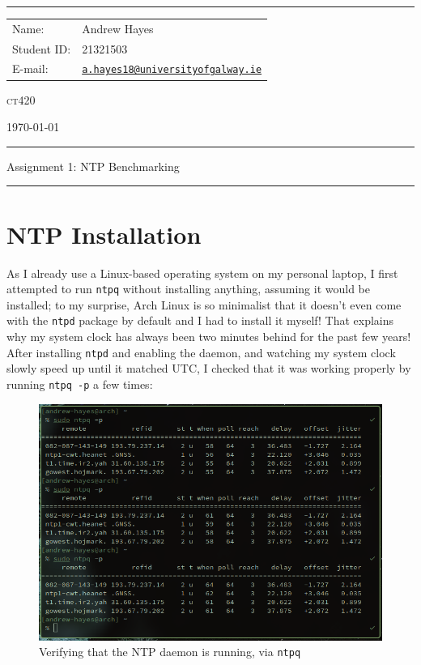 \documentclass[a4paper]{article}
\begin{document}
\hrule \medskip
\begin{minipage}{0.295\textwidth} 
    \raggedright
    \footnotesize 
    \begin{tabular}{@{}l l}
        Name: & Andrew Hayes \\
        Student ID: & 21321503 \\
        E-mail: & \href{mailto://a.hayes18@universityofgalway.ie}{\texttt{a.hayes18@universityofgalway.ie}} \\
    \end{tabular}
\end{minipage}
\begin{minipage}{0.4\textwidth} 
    \centering 
    \vspace{0.4em}
    \LARGE
    \textsc{ct420} \\ 
\end{minipage}
\begin{minipage}{0.295\textwidth} 
    \raggedleft
    \today
\end{minipage}
\medskip\hrule 
\begin{center}
    \normalsize
    Assignment 1: NTP Benchmarking
\end{center}
\hrule
\medskip

\section{NTP Installation}
As I already use a Linux-based operating system on my personal laptop, I first attempted to run \texttt{ntpq} without installing anything, assuming it would be installed;
to my surprise, Arch Linux is so minimalist that it doesn't even come with the \texttt{ntpd} package by default and I had to install it myself!
That explains why my system clock has always been two minutes behind for the past few years!
After installing \texttt{ntpd} and enabling the daemon, and watching my system clock slowly speed up until it matched UTC, I checked that it was working properly by running \texttt{ntpq -p} a few times:

\begin{figure}[H]
    \centering
    \includegraphics[width=\textwidth]{./images/ntpq-p.png}
    \caption{Verifying that the NTP daemon is running, via \texttt{ntpq}}
\end{figure}
\end{document}

